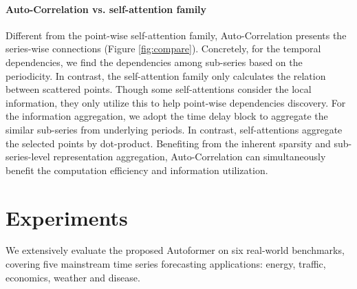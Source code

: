 \paragraph{Auto-Correlation vs. self-attention family} Different from the point-wise self-attention family, Auto-Correlation presents the series-wise connections (Figure \ref{fig:compare}). Concretely, for the temporal dependencies, we find the dependencies among sub-series based on the periodicity. In contrast, the self-attention family only calculates the relation between scattered points. Though some self-attentions \cite{2019Enhancing,haoyietal-informer-2021} consider the local information, they only utilize this to help point-wise dependencies discovery. For the information aggregation, we adopt the time delay block to aggregate the similar sub-series from underlying periods. In contrast, self-attentions aggregate the selected points by dot-product. 
Benefiting from the inherent sparsity and sub-series-level representation aggregation, Auto-Correlation can simultaneously benefit the computation efficiency and information utilization.

\section{Experiments}

We extensively evaluate the proposed Autoformer on six real-world benchmarks, covering five mainstream time series forecasting applications: energy, traffic, economics, weather and disease.

